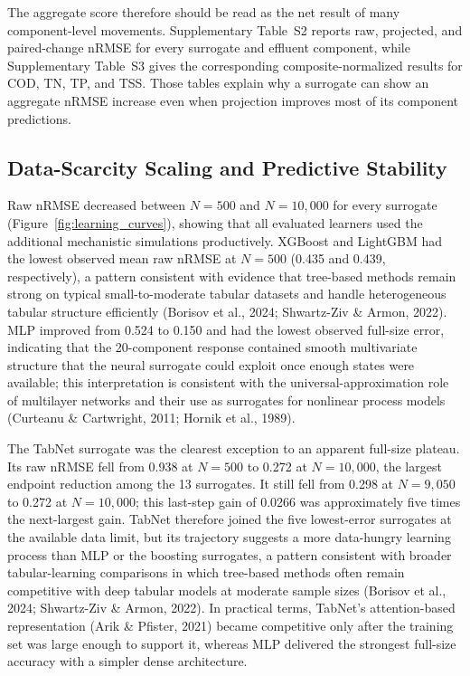 \documentclass[a4paper,fleqn]{cas-sc}
\begin{document}
The aggregate score therefore should be read as the net result of many component-level movements. Supplementary Table~S2 reports raw, projected, and paired-change nRMSE for every surrogate and effluent component, while Supplementary Table~S3 gives the corresponding composite-normalized results for COD, TN, TP, and TSS. Those tables explain why a surrogate can show an aggregate nRMSE increase even when projection improves most of its component predictions.

\subsection{Data-Scarcity Scaling and Predictive Stability}

Raw nRMSE decreased between $N=500$ and $N=10{,}000$ for every surrogate (Figure~\ref{fig:learning_curves}), showing that all evaluated learners used the additional mechanistic simulations productively. XGBoost and LightGBM had the lowest observed mean raw nRMSE at $N=500$ (0.435 and 0.439, respectively), a pattern consistent with evidence that tree-based methods remain strong on typical small-to-moderate tabular datasets and handle heterogeneous tabular structure efficiently (Borisov et al., 2024; Shwartz-Ziv \& Armon, 2022). MLP improved from 0.524 to 0.150 and had the lowest observed full-size error, indicating that the 20-component response contained smooth multivariate structure that the neural surrogate could exploit once enough states were available; this interpretation is consistent with the universal-approximation role of multilayer networks and their use as surrogates for nonlinear process models (Curteanu \& Cartwright, 2011; Hornik et al., 1989).

The TabNet surrogate was the clearest exception to an apparent full-size plateau. Its raw nRMSE fell from 0.938 at $N=500$ to 0.272 at $N=10{,}000$, the largest endpoint reduction among the 13 surrogates. It still fell from 0.298 at $N=9{,}050$ to 0.272 at $N=10{,}000$; this last-step gain of 0.0266 was approximately five times the next-largest gain. TabNet therefore joined the five lowest-error surrogates at the available data limit, but its trajectory suggests a more data-hungry learning process than MLP or the boosting surrogates, a pattern consistent with broader tabular-learning comparisons in which tree-based methods often remain competitive with deep tabular models at moderate sample sizes (Borisov et al., 2024; Shwartz-Ziv \& Armon, 2022). In practical terms, TabNet's attention-based representation (Arik \& Pfister, 2021) became competitive only after the training set was large enough to support it, whereas MLP delivered the strongest full-size accuracy with a simpler dense architecture.
\end{document}
